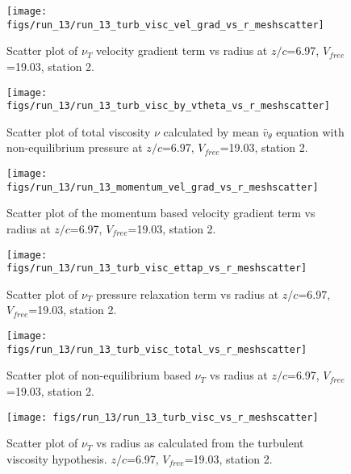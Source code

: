 \begin{figure}[H]
\centering
\texttt{[image: figs/run\_13/run\_13\_turb\_visc\_vel\_grad\_vs\_r\_meshscatter]}
\caption{Scatter plot of $\nu_T$ velocity gradient term vs radius at $z/c$=6.97, $V_{free}$=19.03, station 2.}
\end{figure}


\begin{figure}[H]
\centering
\texttt{[image: figs/run\_13/run\_13\_turb\_visc\_by\_vtheta\_vs\_r\_meshscatter]}
\caption{Scatter plot of total viscosity $\nu$ calculated by mean $\bar{v}_{\theta}$ equation with non-equilibrium pressure at $z/c$=6.97, $V_{free}$=19.03, station 2.}
\end{figure}


\begin{figure}[H]
\centering
\texttt{[image: figs/run\_13/run\_13\_momentum\_vel\_grad\_vs\_r\_meshscatter]}
\caption{Scatter plot of the momentum based velocity gradient term vs radius at $z/c$=6.97, $V_{free}$=19.03, station 2.}
\end{figure}


\begin{figure}[H]
\centering
\texttt{[image: figs/run\_13/run\_13\_turb\_visc\_ettap\_vs\_r\_meshscatter]}
\caption{Scatter plot of $\nu_T$ pressure relaxation term vs radius at $z/c$=6.97, $V_{free}$=19.03, station 2.}
\end{figure}


\begin{figure}[H]
\centering
\texttt{[image: figs/run\_13/run\_13\_turb\_visc\_total\_vs\_r\_meshscatter]}
\caption{Scatter plot of non-equilibrium based $\nu_T$ vs radius at $z/c$=6.97, $V_{free}$=19.03, station 2.}
\end{figure}


\begin{figure}[H]
\centering
\texttt{[image: figs/run\_13/run\_13\_turb\_visc\_vs\_r\_meshscatter]}
\caption{Scatter plot of $\nu_T$ vs radius as calculated from the turbulent viscosity hypothesis. $z/c$=6.97, $V_{free}$=19.03, station 2.}
\end{figure}


